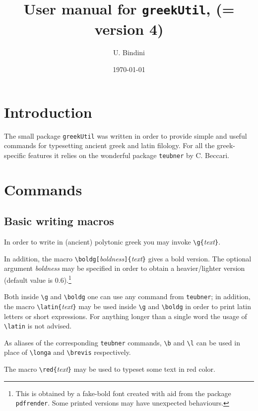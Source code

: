 \documentclass[11pt,a4paper]{article}
\title{User manual for \texttt{greekUtil}, (= version 4)}
\author{U. Bindini}
\date{\today}
\begin{document}
	\maketitle
	
	\section{Introduction}
	
	The small package \texttt{greekUtil} was written in order to provide simple and useful commands for typesetting ancient greek and latin filology. For all the greek-specific features it relies on the wonderful package \verb|teubner| by C. Beccari.
	
	\section{Commands}
	
	\subsection{Basic writing macros}
	
	In order to write in (ancient) polytonic greek you may invoke \verb|\g{|\emph{text}\verb|}|.
	
	In addition, the macro \verb|\boldg[|\emph{boldness}\verb|]{|\emph{text}\verb|}| gives a bold version. The optional argument \emph{boldness} may be specified in order to obtain a heavier/lighter version (default value is 0.6).\footnote{This is obtained by a fake-bold font created with aid from the package \texttt{pdfrender}. Some printed versions may have unexpected behaviours.}
	
	Both inside \verb|\g| and \verb|\boldg| one can use any command from \verb|teubner|; in addition, the macro \verb|\latin{|\emph{text}\verb|}| may be used inside \verb|\g| and \verb|\boldg| in order to print latin letters or short expressions. For anything longer than a single word the usage of \verb|\latin| is not advised.
	
	As aliases of the corresponding \verb|teubner| commands, \verb|\b| and \verb|\l| can be used in place of \verb|\longa| and \verb|\brevis| respectively.
	
	The macro \verb|\red{|\emph{text}\verb|}| may be used to typeset some text in red color.
	
\end{document}
